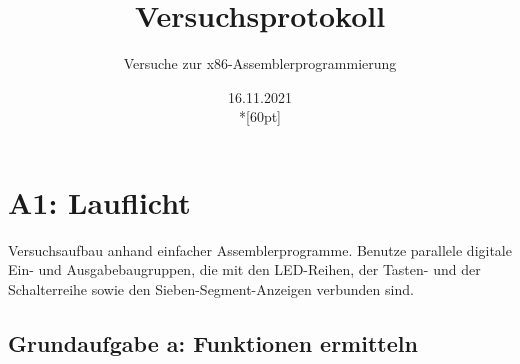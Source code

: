 \documentclass[a4paper,10pt,titlepage]{scrartcl}
\begin{document}
\titlehead
{
        \small
        {
                Technische Universität Ilmenau\\
                Fakulät IA\\
                Fachgebiet Rechnerarchitektur\\

                Praktikum Rechnerarchitektur 1\\
                WS 2021/22}
}

\title {Versuchsprotokoll}
\subtitle{Versuche zur x86-Assemblerprogrammierung}
\author{}
\date{16.11.2021\\*[60pt]}
\maketitle  %

\pagestyle{fancy}
\newpage

\section*{A1: Lauflicht}
Versuchsaufbau anhand einfacher Assemblerprogramme. Benutze parallele digitale Ein- und Ausgabebaugruppen, die mit den LED-Reihen, der Tasten- und der Schalterreihe sowie den Sieben-Segment-Anzeigen verbunden sind.
\subsection*{Grundaufgabe a: Funktionen ermitteln}
\end{document}
